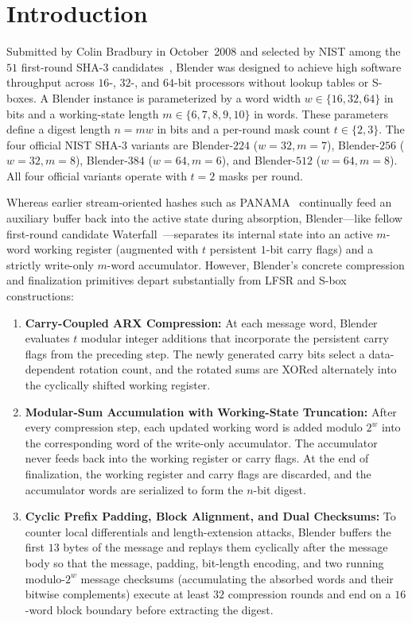 \documentclass[11pt,a4paper]{article}
\theoremstyle{definition}
\theoremstyle{remark}
\begin{document}
\section{Introduction}
\label{sec:intro}

Submitted by Colin Bradbury in October~2008 and selected by NIST among the $51$ first-round SHA-3 candidates~\cite{Bra08}, Blender was designed to achieve high software throughput across $16$-, $32$-, and $64$-bit processors without lookup tables or S-boxes. A Blender instance is parameterized by a word width $w \in \{16, 32, 64\}$ in bits and a working-state length $m \in \{6, 7, 8, 9, 10\}$ in words. These parameters define a digest length $n = mw$ in bits and a per-round mask count $t \in \{2, 3\}$. The four official NIST SHA-3 variants are Blender-$224$ ($w = 32, m = 7$), Blender-$256$ ($w = 32, m = 8$), Blender-$384$ ($w = 64, m = 6$), and Blender-$512$ ($w = 64, m = 8$). All four official variants operate with $t = 2$ masks per round.

Whereas earlier stream-oriented hashes such as PANAMA~\cite{DC98} continually feed an auxiliary buffer back into the active state during absorption, Blender---like fellow first-round candidate Waterfall~\cite{Hat08}---separates its internal state into an active $m$-word working register (augmented with $t$ persistent $1$-bit carry flags) and a strictly write-only $m$-word accumulator. However, Blender's concrete compression and finalization primitives depart substantially from LFSR and S-box constructions:
\begin{enumerate}[leftmargin=2em]
    \item \textbf{Carry-Coupled ARX Compression:} At each message word, Blender evaluates $t$ modular integer additions that incorporate the persistent carry flags from the preceding step. The newly generated carry bits select a data-dependent rotation count, and the rotated sums are XORed alternately into the cyclically shifted working register.
    \item \textbf{Modular-Sum Accumulation with Working-State Truncation:} After every compression step, each updated working word is added modulo $2^w$ into the corresponding word of the write-only accumulator. The accumulator never feeds back into the working register or carry flags. At the end of finalization, the working register and carry flags are discarded, and the accumulator words are serialized to form the $n$-bit digest.
    \item \textbf{Cyclic Prefix Padding, Block Alignment, and Dual Checksums:} To counter local differentials and length-extension attacks, Blender buffers the first $13$ bytes of the message and replays them cyclically after the message body so that the message, padding, bit-length encoding, and two running modulo-$2^w$ message checksums (accumulating the absorbed words and their bitwise complements) execute at least $32$ compression rounds and end on a $16$-word block boundary before extracting the digest.
\end{enumerate}
\end{document}
